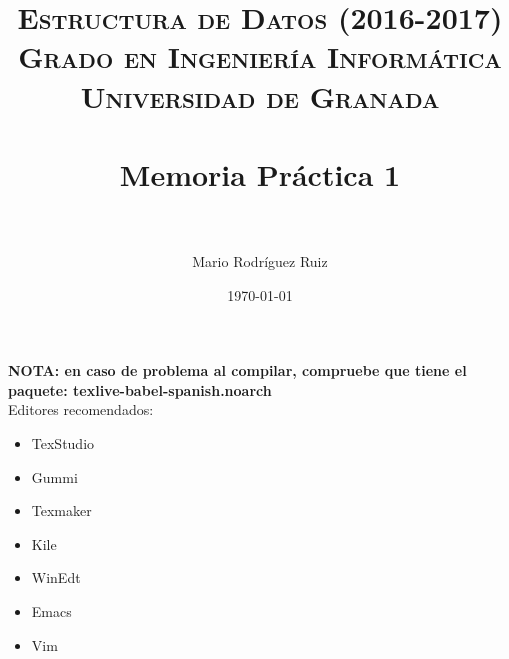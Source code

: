 


\title{	
\normalfont \normalsize 
\textsc{\textbf{Estructura de Datos (2016-2017)} \\ Grado en Ingeniería Informática \\ Universidad de Granada} \\ [25pt] %
\horrule{0.5pt} \\[0.4cm] %
\huge Memoria Práctica 1 \\ %
\horrule{2pt} \\[0.5cm] %
}

\author{Mario Rodríguez Ruiz} %

\date{\normalsize\today} %




\maketitle %

\newpage %

\tableofcontents %

\listoffigures

\listoftables

\newpage

\textbf{NOTA: en caso de problema al compilar, compruebe que tiene el paquete: texlive-babel-spanish.noarch }  \\
 
 
Editores recomendados:
\begin{itemize}
\item TexStudio 
\item Gummi 
\item Texmaker 
\item Kile 
\item WinEdt 
\item Emacs 
\item Vim 
\end{itemize}

